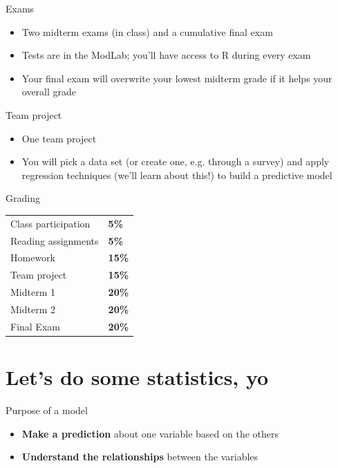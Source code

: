 \documentclass{beamer}\usepackage[]{graphicx}\usepackage[]{color}
\begin{document}
\begin{darkframes}
    \begin{frame}{Exams}
      \begin{itemize}
        \item Two midterm exams (in class) and a cumulative final exam 
        \item Tests are in the ModLab; you'll have access to R during every exam
        \item Your final exam will overwrite your lowest midterm grade if it helps your overall grade
      \end{itemize}
    \end{frame}

    \begin{frame}{Team project}
      \begin{itemize}
        \item One team project
        \item You will pick a data set (or create one, e.g. through a survey) and apply regression techniques (we'll learn about this!) to build a predictive model
      \end{itemize}
    \end{frame}

    \begin{frame}{Grading}
      \begin{center}
        \begin{tabular}{ll}
          Class participation & \textbf{5\%}  \\
          Reading assignments & \textbf{5\%}  \\
          Homework   & \textbf{15\%} \\
          Team project & \textbf{15\%} \\
          Midterm 1  & \textbf{20\%} \\
          Midterm 2  & \textbf{20\%} \\
          Final Exam & \textbf{20\%} \\
        \end{tabular}
      \end{center}
    \end{frame}

    \section{Let's do some statistics, yo}

    \begin{frame}{Purpose of a model}
      \begin{itemize}
        \item \textbf{Make a prediction} about one variable based on the others
        \item \textbf{Understand the relationships} between the variables
      \end{itemize}
    \end{frame}


\end{darkframes}
\end{document}
